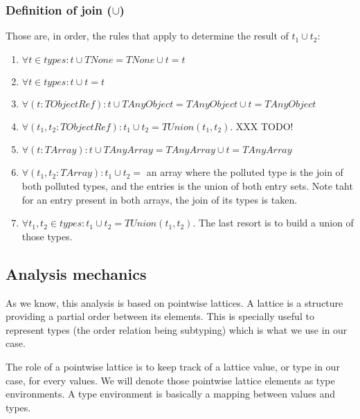 \documentclass[a4paper]{article}
\begin{document}
\subsubsection{Definition of join ($\cup$)}
Those are, in order, the rules that apply to determine the result of $t_1 \cup t_2$:
\begin{enumerate}
  \item $\forall t \in types : t \cup TNone = TNone \cup t = t$
  \item $\forall t \in types : t \cup t = t$
  \item $\forall (t: TObjectRef): t \cup TAnyObject = TAnyObject \cup t = TAnyObject$
  \item $\forall (t_1,t_2: TObjectRef): t_1 \cup t_2 = TUnion(t_1, t_2)$. XXX TODO!
  \item $\forall (t: TArray): t \cup TAnyArray = TAnyArray \cup t = TAnyArray$
  \item $\forall (t_1,t_2: TArray): t_1 \cup t_2 = $ an array where the polluted type
    is the join of both polluted types, and the entries is the union of both
    entry sets. Note taht for an entry present in both arrays, the join of its
    types is taken.

  \item $\forall t_1,t_2 \in types: t_1 \cup t_2 = TUnion(t_1, t_2)$. The last
    resort is to build a union of those types.
\end{enumerate}

\subsection{Analysis mechanics}
As we know, this analysis is based on pointwise lattices. A lattice is a
structure providing a partial order between its elements. This is specially
useful to represent types (the order relation being subtyping) which is what
we use in our case.

The role of a pointwise lattice is to keep track of a lattice value, or type in
our case, for every values. We will denote those pointwise lattice elements as
type environments. A type environment is basically a mapping between values and
types.
\end{document}
